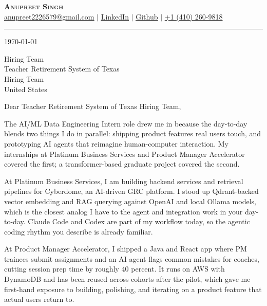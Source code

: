 \documentclass[letterpaper,11pt]{article}
\newcommand{\companyName}{Teacher Retirement System of Texas}
\newcommand{\companyTeam}{Hiring Team}
\newcommand{\roleTitle}{AI/ML Data Engineering Intern}
\newcommand{\companyCity}{United States}
\begin{document}
\begin{center}
    \textbf{\Huge \scshape Anupreet Singh} \\ \vspace{2pt}
    \small \href{mailto:anupreet2226579@gmail.com}{\underline{anupreet2226579@gmail.com}}
    $|$
    \href{https://www.linkedin.com/in/anupreet-singh-71b1861b8/}{\underline{LinkedIn}}
    $|$
    \href{https://github.com/anupreetsingh}{\underline{Github}}
    $|$
    \underline{+1 (410) 260-9818}
\end{center}

\vspace{4pt}
\hrule
\vspace{10pt}

\today

\vspace{4pt}
Hiring Team \\
\companyName \\
\companyTeam \\
\companyCity

Dear \companyName{} Hiring Team,

The \roleTitle{} role drew me in because the day-to-day blends two things I do in parallel: shipping product features real users touch, and prototyping AI agents that reimagine human-computer interaction. My internships at Platinum Business Services and Product Manager Accelerator covered the first; a transformer-based graduate project covered the second.

At Platinum Business Services, I am building backend services and retrieval pipelines for Cyberdome, an AI-driven GRC platform. I stood up Qdrant-backed vector embedding and RAG querying against OpenAI and local Ollama models, which is the closest analog I have to the agent and integration work in your day-to-day. Claude Code and Codex are part of my workflow today, so the agentic coding rhythm you describe is already familiar.

At Product Manager Accelerator, I shipped a Java and React app where PM trainees submit assignments and an AI agent flags common mistakes for coaches, cutting session prep time by roughly 40 percent. It runs on AWS with DynamoDB and has been reused across cohorts after the pilot, which gave me first-hand exposure to building, polishing, and iterating on a product feature that actual users return to.
\end{document}
